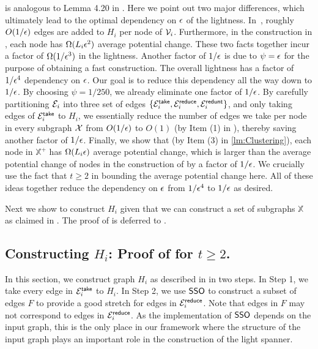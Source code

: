  is analogous to Lemma 4.20 in \cite{LS21}. Here we point out two major differences, which ultimately lead to the optimal dependency on $\epsilon$ of the lightness. In~\cite{LS21}, roughly $O(1/\epsilon)$ edges are added to $H_i$ per node of $\mathcal{V}_i$. Furthermore, in the construction in \cite{LS21}, each node has $\Omega(L_i \epsilon^2)$ average potential change. These two facts together incur a factor of $\Omega(1/\epsilon^3)$ in the lightness. Another factor of $1/\epsilon$ is due to $\psi = \epsilon$ for the purpose of obtaining a fast construction. The overall lightness has a factor of $1/\epsilon^4$ dependency on $\epsilon$. Our goal is to reduce this dependency all the way down to $1/\epsilon$. By choosing $\psi = 1/250$, we already eliminate one factor of $1/\epsilon$. By carefully partitioning $\mathcal{E}_i$ into three set of edges  $\{\mathcal{E}_i^{\mathsf{take}}, \mathcal{E}_i^{\mathsf{reduce}}, \mathcal{E}_i^{\mathsf{redunt}}\}$, and only taking  edges of $\mathcal{E}_i^{\mathsf{take}}$ to $H_i$, we essentially reduce the number of edges we take per node in every subgraph $\mathcal{X}$ from $O(1/\epsilon)$ to $O(1)$ (by Item (1) in ), thereby saving another factor of $1/\epsilon$. Finally, we show that (by Item (3) in \cref{lm:Clustering}), each node in $\mathbb{X}^+$ has $\Omega(L_i \epsilon)$ average potential change, which is larger than the average potential change of nodes in the construction of \cite{LS21} by a factor of $1/\epsilon$. We crucially use the fact that $t\geq 2$ in bounding   the average potential change here. All of these ideas together reduce the dependency on $\epsilon$ from $1/\epsilon^{4}$ to $1/\epsilon$ as desired. 


Next we show to construct $H_i$ given that we can construct a set of subgraphs $\mathbb{X}$ as claimed in . The proof of  is deferred to .

\subsection{Constructing $H_i$: Proof of  for $t\geq 2$.} \label{subsec:ConstructHiT2}

In this section, we construct graph $H_i$ as described in  in two steps. In Step 1, we take every edge  in $\mathcal{E}^{\mathsf{take}}_i$ to $H_i$. In Step 2, we use \hyperlink{SPHigh}{$\mathsf{SSO}$} to construct a subset of edges $F$ to provide a good stretch for edges in $\mathcal{E}^{\mathsf{reduce}}_i$. Note that edges in $F$ may not correspond to edges in $\mathcal{E}^{\mathsf{reduce}}_i$.  As the implementation of  \hyperlink{SPHigh}{$\mathsf{SSO}$} depends on the input graph, this is the only place in our framework where the structure of the input graph plays an important role in the construction of the light spanner.

